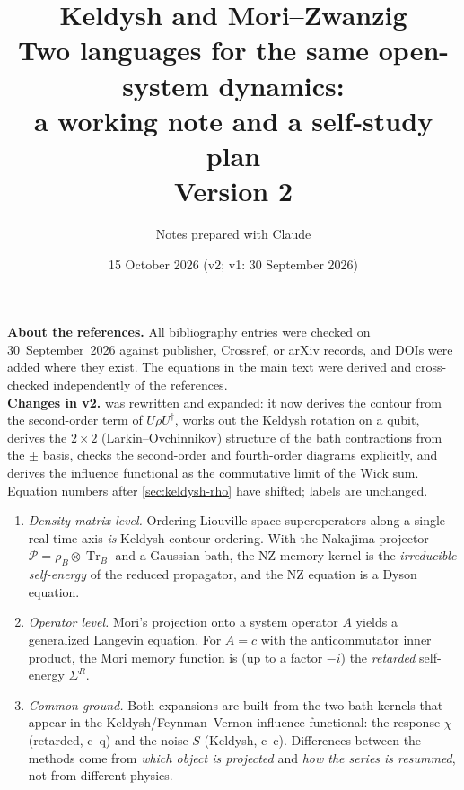 \documentclass[11pt]{article}
\title{\textbf{Keldysh and Mori--Zwanzig}\\[2pt]
\large Two languages for the same open-system dynamics:\\ a working note and a self-study plan\\[4pt] \normalsize Version 2}
\author{Notes prepared with Claude}
\date{15 October 2026 (v2; v1: 30 September 2026)}
\newcommand{\Tr}{\operatorname{Tr}}
\newcommand{\Pc}{\mathcal{P}}
\newcommand{\rhoB}{\rho_{B}}
\begin{document}
\maketitle

\begin{warnbox}
\small\textbf{About the references.} All bibliography entries were checked on
30~September~2026 against publisher, Crossref, or arXiv records, and DOIs were added
where they exist. The equations in the main text were derived and cross-checked
independently of the references.\\[3pt]\textbf{Changes in v2.}  was rewritten and expanded: it now derives the contour from the second-order term of $U\rho U^\dagger$, works out the Keldysh rotation on a qubit, derives the $2\times2$ (Larkin--Ovchinnikov) structure of the bath contractions from the $\pm$ basis, checks the second-order and fourth-order diagrams explicitly, and derives the influence functional as the commutative limit of the Wick sum. Equation numbers after \cref{sec:keldysh-rho} have shifted; labels are unchanged.
\end{warnbox}

\begin{keybox}
\begin{enumerate}\itemsep0pt
\item \emph{Density-matrix level.} Ordering Liouville-space superoperators along a
  single real time axis \emph{is} Keldysh contour ordering. With the Nakajima projector
  $\Pc=\rhoB\otimes\Tr_B$ and a Gaussian bath, the NZ memory kernel is the
  \emph{irreducible self-energy} of the reduced propagator, and the NZ equation is a
  Dyson equation.
\item \emph{Operator level.} Mori's projection onto a system operator $A$ yields a
  generalized Langevin equation. For $A=c$ with the anticommutator inner product, the
  Mori memory function is (up to a factor $-i$) the \emph{retarded} self-energy
  $\Sigma^R$.
\item \emph{Common ground.} Both expansions are built from the two bath kernels that
  appear in the Keldysh/Feynman--Vernon influence functional: the response
  $\chi$ (retarded, $\mathrm{c}\text{--}\mathrm{q}$) and the noise $S$ (Keldysh,
  $\mathrm{c}\text{--}\mathrm{c}$). Differences between the methods come from
  \emph{which object is projected} and \emph{how the series is resummed}, not from
  different physics.
\end{enumerate}
\end{keybox}
\end{document}

